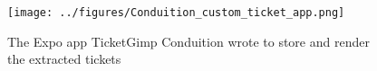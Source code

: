 \begin{figure}[H]
    \begin{center}
    \texttt{[image: ../figures/Conduition\_custom\_ticket\_app.png]}
    \caption{The Expo app TicketGimp Conduition wrote to store and render the extracted tickets \cite{reverse_engineering_ticketmaster}}
    \label{fig:conduition_custom_app}
    \end{center}
\end{figure}
